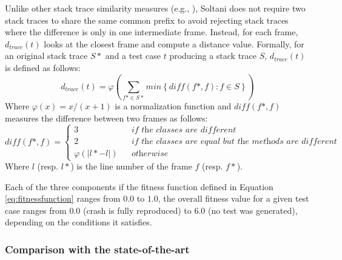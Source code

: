 Unlike other stack trace similarity measures (e.g., \cite{Rossler2013}), Soltani \etal \cite{Soltani2018a} does not require two stack traces to share the same common prefix to avoid rejecting stack traces where the difference is only in one intermediate frame. Instead, for each frame, $d_{trace}(t)$ looks at the closest frame and compute a distance value. Formally, for an original stack trace $S*$ and a test case $t$ producing a stack trace $S$, $d_{trace}(t)$ is defined as follows:
%
\begin{equation}
d_{trace}(t) = \varphi \left( \sum_{f* \in S*} min \left\lbrace \mathit{diff}(f*, f) : f \in S \right\rbrace \right)
\end{equation}
%
Where $\varphi (x) = x / (x+1)$ is a normalization function \cite{McMinn2004} and $\mathit{diff}(f*, f)$ measures the difference between two frames as follows: 
%
\begin{equation}
\mathit{diff}(f*, f) = 
\left\{
  \begin{array}{lcr}
    3 && \textit{if the classes are different}\\
    2  && \textit{if the classes are equal but the methods are different}\\
     \varphi \left( \vert l* - l \vert \right)   && \textit{otherwise}
  \end{array}
\right.
\end{equation}
%
Where $l$ (resp. $l*$) is the line number of the frame $f$ (resp. $f*$).

Each of the three components if the fitness function defined in Equation \ref{eq:fitnessfunction} ranges from $0.0$ to $1.0$, the overall fitness value for a given test case ranges from $0.0$ (crash is fully reproduced) to $6.0$ (no test was generated), depending on the conditions it satisfies. 

\subsubsection{Comparison with the state-of-the-art}

